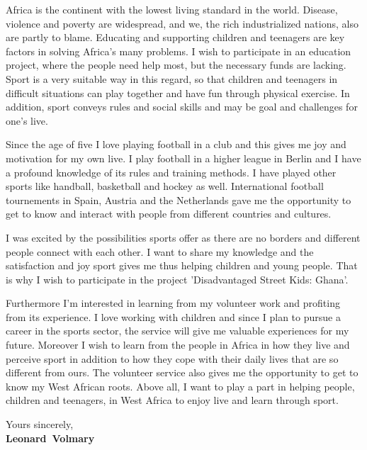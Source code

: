 \documentclass[11pt,a4paper]{article}
\def\firstname{Leonard}
\def\familyname{Volmary}
\begin{document}
Africa is the continent with the lowest living standard in the world. Disease, violence and poverty are widespread, and we, the rich industrialized nations, also are partly to blame. Educating and supporting children and teenagers are key factors in solving Africa's many problems. I wish to participate in an education project, where the people need help most, but the necessary funds are lacking. Sport is a very suitable way in this regard, so that children and teenagers in difficult situations can play together and have fun through physical exercise. In addition, sport conveys rules and social skills and may be goal and challenges for one's live.

Since the age of five I love playing football in a club and this gives me joy and motivation for my own live. I play football in a higher league in Berlin and I have a profound knowledge of its rules and training methods. I have played other sports like handball, basketball and hockey as well. International football tournements in Spain, Austria and the Netherlands gave me the opportunity to get to know and interact with people from different countries and cultures. 

I was excited by the possibilities sports offer as there are no borders and different people connect with each other. I want to share my knowledge and the satisfaction and joy sport gives me thus helping children and young people. That is why I wish to participate in the project 'Disadvantaged Street Kids: Ghana'. 

Furthermore I'm interested in learning from my volunteer work and profiting from its experience. I love working with children and since I plan to pursue a career in the sports sector, the service will give me valuable experiences for my future. Moreover I wish to learn from the people in Africa in how they live and perceive sport in addition to how they cope with their daily lives that are so different from ours. The volunteer service also gives me the opportunity to get to know my West African roots. Above all, I want to play a part in helping people, children and teenagers, in West Africa to enjoy live and learn through sport. 

  
Yours sincerely,\\[2em] %
%
{\bfseries \firstname~\familyname}\\
%
\end{document}

